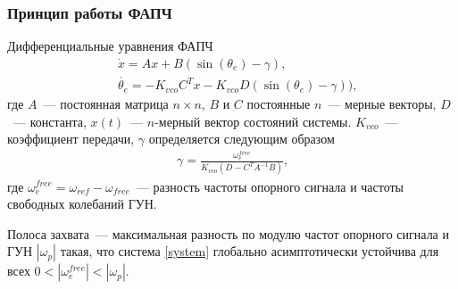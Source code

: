 \documentclass{beamer}
\begin{document}

\begin{frame}
\frametitle{Принцип работы ФАПЧ}
Дифференциальные уравнения ФАПЧ
 \begin{equation}\label{system}
 \begin{aligned}
 &\dot{x} = Ax + B(\operatorname{sin}(\theta_e) - \gamma)\text{,}\\[0.3pt]
 &\dot{\theta_e} = -K_{vco}C^T x -K_{vco}D(\operatorname{sin}(\theta_e) - \gamma))\text{,}
 \end{aligned}
\end{equation}
где $A$~--- постоянная матрица $n \times n$, $B$ и $C$ постоянные $n$~--- мерные векторы, $D$~--- константа, $x(t)$~--- $n$-мерный вектор состояний системы. $K_{vco}$~--- коэффициент передачи, $\gamma$ определяется следующим образом\vspace{-1mm}
 \begin{equation}\label{gamma}
 \begin{aligned}
\gamma = \frac{\omega_e^{free}}{K_{vco}\left(D-C^T A^{-1}B\right)}\text{,}
 \end{aligned}
\end{equation}
где $\omega^{free}_{e}=\omega_{ref}-\omega_{free}$~--- разность частоты опорного сигнала и частоты свободных колебаний ГУН.
\begin{definition}
Полоса захвата~--- максимальная разность по модулю частот опорного сигнала и ГУН $|\omega_p|$ такая, что система \eqref{system} глобально асимптотически устойчива для всех $0<|\omega_e^{free}|<|\omega_p|$.
\end{definition}
\end{frame}

\end{document}
